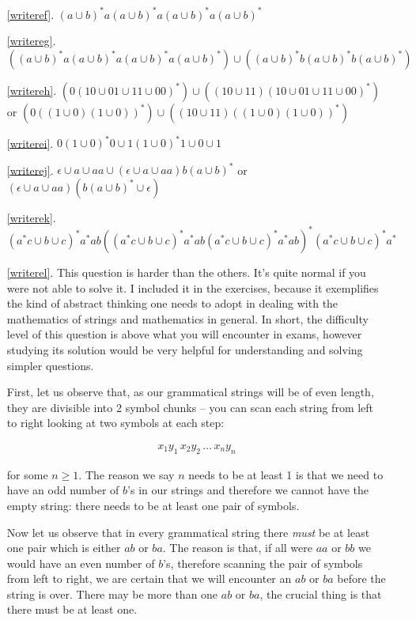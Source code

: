 \documentclass[11pt]{article}
\begin{document}
\begin{itemize}
\begin{enumerate}
\item[\ref{writeref}.] $(a\cup b)^*a(a\cup b)^*a(a\cup b)^*a(a\cup b)^*$

\item[\ref{writereg}.] $((a\cup b)^*a(a\cup b)^*a(a\cup b)^*a(a\cup b)^*) \cup((a\cup b)^*b(a\cup b)^*b(a\cup b)^*)$

\item[\ref{writereh}.] $(0(10\cup 01\cup 11\cup 00)^*) \cup ((10\cup 11)(10\cup 01\cup 11\cup 00)^*)$
or $(0((1\cup 0)(1\cup 0))^*) \cup ((10\cup 11)((1\cup 0)(1\cup 0))^*)$

\item[\ref{writerei}.] $0(1\cup 0)^*0\cup 1(1\cup 0)^*1 \cup 0 \cup 1$
\item[\ref{writerej}.]
$\epsilon\cup a \cup aa\cup (\epsilon\cup a\cup aa)b(a\cup b)^*$
or $(\epsilon\cup a\cup aa)(b(a\cup b)^* \cup \epsilon)$

\item[\ref{writerek}.] $(a^*c\cup b\cup c)^*a^*ab((a^*c\cup b\cup c)^*a^*ab(a^*c\cup b\cup c)^*a^*ab)^*(a^*c\cup b\cup c)^*a^*$

\item[\ref{writerel}.] 
This question is harder than the others. It's quite normal if you were not
able to solve it. I included it in the exercises, because it exemplifies the
kind of abstract thinking one needs to adopt in dealing with the mathematics of
strings and mathematics in general. In short, the difficulty level of this
question is above what you will encounter in exams, however studying its
solution would be very helpful for understanding and solving simpler questions.

First, let us observe that, as our grammatical strings will be of even length,
they are divisible into 2 symbol chunks -- you can scan each string from left to
right looking at two symbols at each step:

\begin{align}
x_1y_1\, x_2y_2\,\ldots\, x_ny_n
\end{align}

for some $n \geq 1$. The reason we say $n$ needs to be at least 1 is that we
need to have an odd number of $b$'s in our strings and therefore we cannot have
the empty string: there needs to be at least one pair of symbols.

Now let us observe that in every grammatical string there \emph{must} be at
least one pair which is either $ab$ or $ba$. The reason is that, if all were
$aa$ or $bb$ we would have an even number of $b$'s, therefore scanning the pair
of symbols from left to right, we are certain that we will encounter an $ab$ or
$ba$ before the string is over. There may be more than one $ab$ or $ba$, the
crucial thing is that there must be at least one.


\end{enumerate}
\end{itemize}
\end{document}
